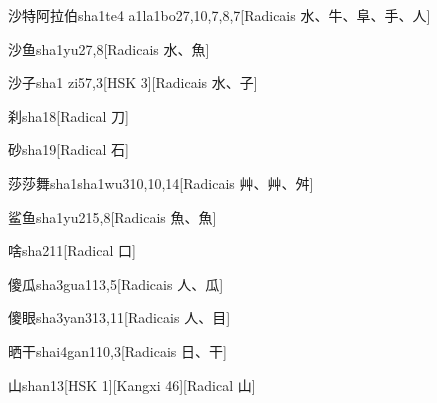 \begin{entry}{沙特阿拉伯}{sha1te4 a1la1bo2}{7,10,7,8,7}[Radicais ⽔、⽜、⾩、⼿、⼈]
\end{entry}

\begin{entry}{沙鱼}{sha1yu2}{7,8}[Radicais ⽔、⿂]
\end{entry}

\begin{entry}{沙子}{sha1 zi5}{7,3}[HSK 3][Radicais ⽔、⼦]
\end{entry}

\begin{entry}{刹}{sha1}{8}[Radical ⼑]
\end{entry}

\begin{entry}{砂}{sha1}{9}[Radical ⽯]
\end{entry}

\begin{entry}{莎莎舞}{sha1sha1wu3}{10,10,14}[Radicais ⾋、⾋、⾇]
\end{entry}

\begin{entry}{鲨鱼}{sha1yu2}{15,8}[Radicais ⿂、⿂]
\end{entry}

\begin{entry}{啥}{sha2}{11}[Radical ⼝]
\end{entry}

\begin{entry}{傻瓜}{sha3gua1}{13,5}[Radicais ⼈、⽠]
\end{entry}

\begin{entry}{傻眼}{sha3yan3}{13,11}[Radicais ⼈、⽬]
\end{entry}

\begin{entry}{晒干}{shai4gan1}{10,3}[Radicais ⽇、⼲]
\end{entry}

\begin{entry}{山}{shan1}{3}[HSK 1][Kangxi 46][Radical ⼭]
\end{entry}

